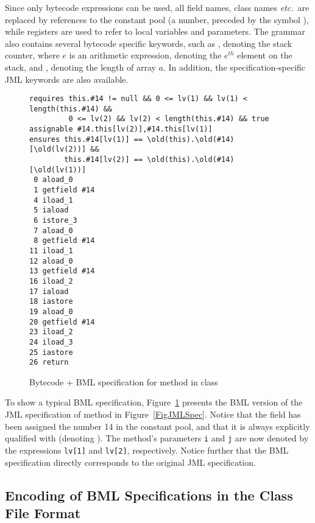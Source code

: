 Since only bytecode expressions can be used, all field names, class
names \emph{etc.}\ are replaced by references to the constant pool (a
number, preceded by the symbol \codeHook{\#}), while registers are
used to refer to local variables and parameters. The grammar also
contains several bytecode specific keywords, such as ,
denoting the stack counter,  where \(e\) is an
arithmetic expression, denoting the \(e^{th}\) element on the stack, and
, denoting the length of array \(a\). In
addition, the specification-specific JML keywords are also available.




\begin{figure}[t]
{\small
\begin{verbatim}
requires this.#14 != null && 0 <= lv(1) && lv(1) < length(this.#14) &&
         0 <= lv(2) && lv(2) < length(this.#14) && true
assignable #14.this[lv(2)],#14.this[lv(1)]
ensures this.#14[lv(1)] == \old(this).\old(#14)[\old(lv(2))] && 
        this.#14[lv(2)] == \old(this).\old(#14)[\old(lv(1))]
 0 aload_0
 1 getfield #14 
 4 iload_1
 5 iaload
 6 istore_3
 7 aload_0
 8 getfield #14 
11 iload_1
12 aload_0
13 getfield #14 
16 iload_2
17 iaload
18 iastore
19 aload_0
20 getfield #14 
23 iload_2
24 iload_3
25 iastore
26 return
\end{verbatim}
}
\vspace*{-1em}\caption{Bytecode + BML specification for method  in class }\label{FigBMLSpec}
\end{figure}

To show a typical BML specification, Figure~\ref{FigBMLSpec} presents
the BML version of the JML specification of method
 in Figure~\ref{FigJMLSpec}. 
Notice that the field  has been assigned the number 14
in the constant pool, and that it is always explicitly qualified with
 (denoting ). The method's parameters
\texttt{i} and \texttt{j} are now denoted by the expressions
\texttt{lv[1]} and \texttt{lv[2]}, respectively. Notice further that
the BML specification directly corresponds to the original JML
specification.


 
\subsection{Encoding of BML Specifications in the Class File Format}

